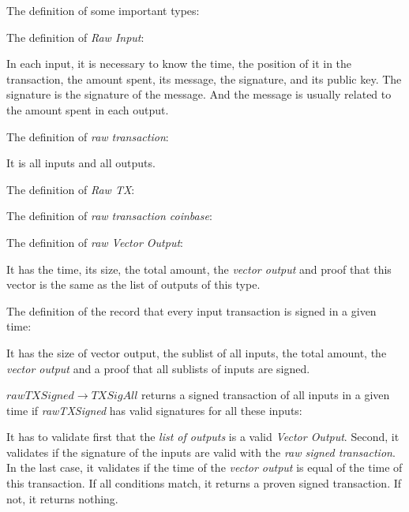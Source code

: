 The definition of some important types:


The definition of \emph{Raw Input}:


In each input, it is necessary to know the time, the position of it in the transaction,
the amount spent, its message, the signature, and its public key.
The signature is the signature of the message.
And the message is usually related to the amount spent in each output.

The definition of \emph{raw transaction}:


It is all inputs and all outputs.

The definition of \emph{Raw TX}:


The definition of \emph{raw transaction coinbase}:


The definition of \emph{raw Vector Output}: 


It has the time, its size, the total amount, the \emph{vector output}
and proof that this vector is the same as the list of outputs of this type.

The definition of the record that every input transaction is signed in a given time:


It has the size of vector output, the sublist of all inputs, the total amount,
the \emph{vector output} and a proof that all sublists of inputs are signed.

$rawTXSigned \to TXSigAll$ returns a signed transaction of all inputs in a given time
if \emph{rawTXSigned} has valid signatures for all these inputs:


It has to validate first that the \emph{list of outputs} is a valid \emph{Vector Output}.
Second, it validates if the signature of the inputs are valid with the
\emph{raw signed transaction}.
In the last case, it validates if the time of the \emph{vector output} is equal
of the time of this transaction.
If all conditions match, it returns a proven signed transaction.
If not, it returns nothing.

